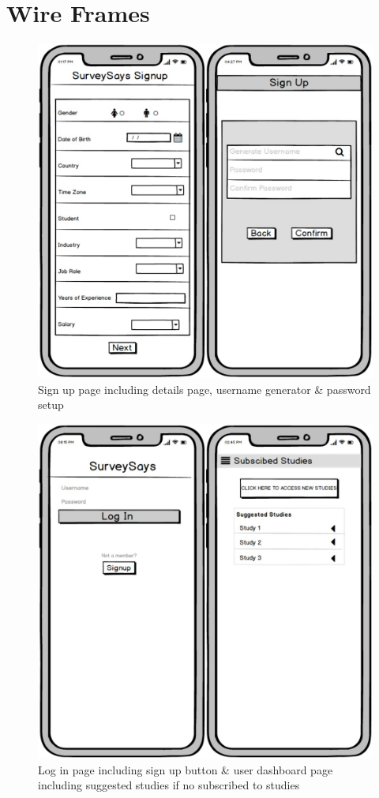 \documentclass[12pt, a4paper]{report}
\begin{document}
\section{Wire Frames}
\begin{figure} [h]
\centering
\includegraphics[scale=0.35]{images/pic1.jpeg}
\caption{\centering Sign up page including details page, username generator \& password setup}
\end{figure}
\begin{figure} [h]
\centering
\begin{center}
\includegraphics[scale=0.35]{images/pic2.jpg}
\end{center}
\caption{\centering Log in page including sign up button \& user dashboard page including suggested studies if no subscribed to studies}
\end{figure}
\end{document}
